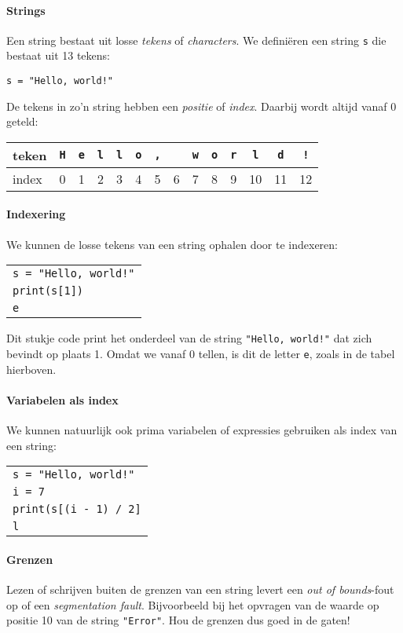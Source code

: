\paragraph{Strings} Een string bestaat uit losse \emph{tekens} of \emph{characters}. We defini\"{e}ren een string \texttt{s} die bestaat uit 13 tekens:

\begin{verbatim}
s = "Hello, world!"
\end{verbatim}

De tekens in zo'n string hebben een \emph{positie} of \emph{index}. Daarbij wordt altijd vanaf 0 geteld:

\begin{tabular}{l|ccccccccccccc}
teken&\texttt{H}&\texttt{e}&\texttt{l}&\texttt{l}&\texttt{o}&\texttt{,}&\texttt{ }&\texttt{w}&\texttt{o}&\texttt{r}&\texttt{l}&\texttt{d}&\texttt{!}\\
\hline
index&0&1&2&3&4& 5&6&7&8&9& 10&11&12 \\
\end{tabular}

\paragraph{Indexering}

We kunnen de losse tekens van een string ophalen door te indexeren:

\begin{tabular}{l}
\texttt{s = "Hello, world!"} \\
\texttt{print(s[1])} \\
\hline
\texttt{e}
\end{tabular}

Dit stukje code print het onderdeel van de string \texttt{"Hello, world!"} dat zich bevindt op plaats 1. Omdat we vanaf 0 tellen, is dit de letter \texttt{e}, zoals in de tabel hierboven.

\paragraph{Variabelen als index}
We kunnen natuurlijk ook prima variabelen of expressies gebruiken als index van een string:

\begin{tabular}{l}
\texttt{s = "Hello, world!"} \\
\texttt{i = 7} \\
\texttt{print(s[(i - 1) / 2]} \\
\hline
\texttt{l}
\end{tabular}

\paragraph{Grenzen}

Lezen of schrijven buiten de grenzen van een string levert een \emph{out of bounds}-fout op of een \emph{segmentation fault}. Bijvoorbeeld bij het opvragen van de waarde op positie 10 van de string \texttt{"Error"}. Hou de grenzen dus goed in de gaten!

